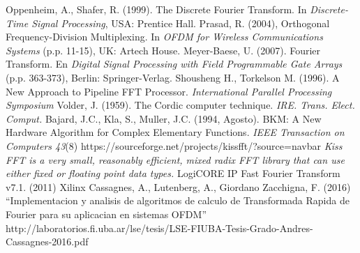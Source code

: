 \documentclass[conference]{IEEEtran}
\begin{document}

%
%
%



\begin{thebibliography}{1}
               Oppenheim, A., Shafer, R. (1999). The Discrete Fourier Transform. In
                                    \textit{Discrete-Time Signal Processing}, USA: Prentice Hall.
                 Prasad, R. (2004), Orthogonal Frequency-Division Multiplexing. 
                                    In \textit{OFDM for Wireless Communications Systems} (p.p. 11-15), UK: Artech House.
                Meyer-Baese, U. (2007). Fourier Transform. En \textit{Digital Signal Processing
                                    with Field Programmable Gate Arrays} (p.p. 363-373), Berlin: Springer-Verlag.
                 Shousheng H., Torkelson M. (1996). A New Approach to Pipeline FFT Processor.
                                    \textit{International Parallel Processing Symposium}
                    Volder, J. (1959). The Cordic computer technique. \textit{IRE. Trans. Elect. Comput.}
                       Bajard, J.C., Kla, S., Muller, J.C. (1994, Agosto). BKM: A New Hardware Algorithm for
                                    Complex Elementary Functions. \textit{IEEE Transaction on Computers 43}(8)
                   https://sourceforge.net/projects/kissfft/?source=navbar \textit{Kiss FFT is a very small, 
                                    reasonably efficient, mixed radix FFT library that can use either fixed or floating point data
                                    types.}
                 LogiCORE IP Fast Fourier Transform v7.1. (2011) Xilinx
                     Cassagnes, A., Lutenberg, A., Giordano Zacchigna, F. (2016) ``Implementacion y analisis de algoritmos
                                    de calculo de Transformada Rapida de Fourier para su aplicacian en sistemas OFDM'' 
                                    http://laboratorios.fi.uba.ar/lse/tesis/LSE-FIUBA-Tesis-Grado-Andres-Cassagnes-2016.pdf
\end{thebibliography}
\end{document}
